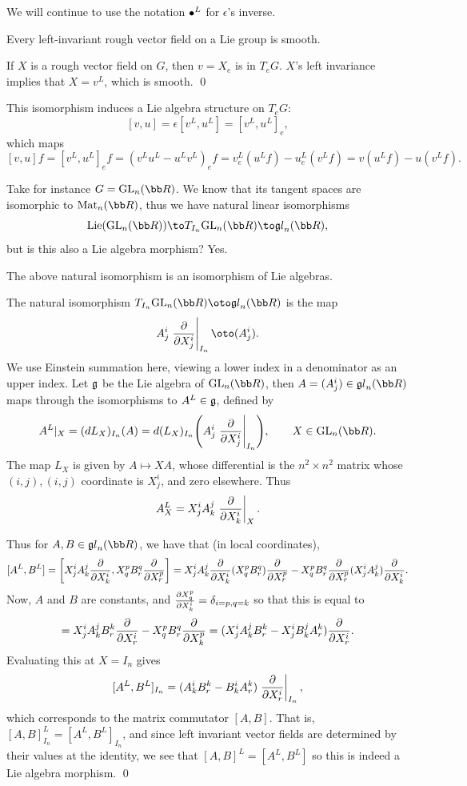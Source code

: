 \eproof

We will continue to use the notation $\bullet^L$ for $\epsilon$'s inverse.

\bcoro

    Every left-invariant rough vector field on a Lie group is smooth.

\ecoro

\bproof

    If $X$ is a rough vector field on $G$, then $v=X_e$ is in $T_eG$.
    $X$'s left invariance implies that $X=v^L$, which is smooth.
    \qed

\eproof

This isomorphism induces a Lie algebra structure on $T_eG$:
$$ [v,u] = \epsilon[v^L,u^L] = [v^L,u^L]_e, $$
which maps
$$ [v,u]f = [v^L,u^L]_ef = (v^Lu^L - u^Lv^L)_ef = v^L_e(u^Lf) - u^L_e(v^Lf) = v(u^Lf) - u(v^Lf) . $$

Take for instance $G=\gl_n(\bR)$.
We know that its tangent spaces are isomorphic to $\mat_n(\bR)$, thus we have natural linear isomorphisms
$$ \lie(\gl_n(\bR)) \to T_{I_n}\gl_n(\bR) \to \lgl_n(\bR) , $$
but is this also a Lie algebra morphism?
Yes.

\bprop

    The above natural isomorphism is an isomorphism of Lie algebras.

\eprop

\bproof

    The natural isomorphism $T_{I_n}\gl_n(\bR)\oto\lgl_n(\bR)$ is the map
    $$ A^i_j\evpdv{X^i_j}_{I_n} \oto (A^i_j) . $$
    We use Einstein summation here, viewing a lower index in a denominator as an upper index.
    Let ${{\frak g}}$ be the Lie algebra of $\gl_n(\bR)$, then $A=(A^i_j)\in\lgl_n(\bR)$ maps through the isomorphisms to $A^L\in{{\frak g}}$, defined by
    $$ A^L|_X = (dL_X)_{I_n}(A) = d(L_X)_{I_n}\parens{A^i_j\evpdv{X^i_j}_{I_n}},\qquad X\in\gl_n(\bR) . $$
    The map $L_X$ is given by $A\mapsto XA$, whose differential is the $n^2\times n^2$ matrix whose $(i,j),(i,j)$ coordinate is $X^i_j$,
    and zero elsewhere.
    Thus
    $$ A^L_X = X^i_jA^j_k\left.{{\partial }\over{\partial X^i_k}}\right|_X . $$

    Thus for $A,B\in\lgl_n(\bR)$, we have that (in local coordinates),
    $$ [A^L,B^L] = \mathopen{}\mathclose{\left[X^i_jA^j_k{{\partial }\over{\partial X^i_k}},X^p_qB^q_r{{\partial }\over{\partial X^p_r}}\right]} = X^i_jA^j_k{{\partial }\over{\partial X^i_k}}(X^p_qB^q_r){{\partial }\over{\partial X^p_r}}
    - X^p_qB^q_r{{\partial }\over{\partial X^p_r}}(X^i_jA^j_k){{\partial }\over{\partial X^i_k}} . $$
    Now, $A$ and $B$ are constants, and ${{\partial X^p_q}\over{\partial X^i_k}}=\delta_{i=p,q=k}$ so that this is equal to
    $$ = X^i_jA^j_kB^k_r{{\partial }\over{\partial X^i_r}} - X^p_qB^q_r{{\partial }\over{\partial X^p_k}} = (X^i_jA^j_kB^k_r-X^i_jB^j_kA^k_r){{\partial }\over{\partial X^i_r}} . $$
    Evaluating this at $X=I_n$ gives
    $$ [A^L,B^L]_{I_n} = (A^i_kB^k_r-B^i_kA^k_r)\left.{{\partial }\over{\partial X^i_r}}\right|_{I_n} , $$
    which corresponds to the matrix commutator $[A,B]$.
    That is, $[A,B]^L_{I_n}=[A^L,B^L]_{I_n}$, and since left invariant vector fields are determined by their values at the identity,
    we see that $[A,B]^L=[A^L,B^L]$ so this is indeed a Lie algebra morphism.
    \qed

